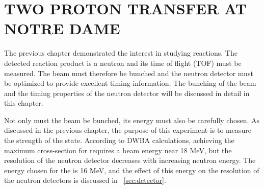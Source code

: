 %
%
%
%
%
%
%
%

%
%

\chapter{TWO PROTON TRANSFER AT NOTRE DAME}
\label{chap:2pExpt}

The previous chapter demonstrated the interest in studying \reaction reactions.  The detected reaction product is a neutron and its time of flight (TOF) must be measured.  The beam must therefore be bunched and the neutron detector must be optimized to provide excellent timing information.  The bunching of the beam and the timing properties of the neutron detector will be discussed in detail in this chapter.   


Not only must the beam be bunched, its energy must also be carefully chosen.  As discussed in the previous chapter, the purpose of this experiment is to measure the strength of the \zp state.  According to DWBA calculations, achieving the maximum \zp cross-section for \reaction requires a beam energy near 18 MeV, but the resolution of the neutron detector decreases with increasing neutron energy.  The energy chosen for the  is 16 MeV, and the effect of this energy on the resolution of the neutron detectors is discussed in {\sect}~\ref{sec:detector}.


